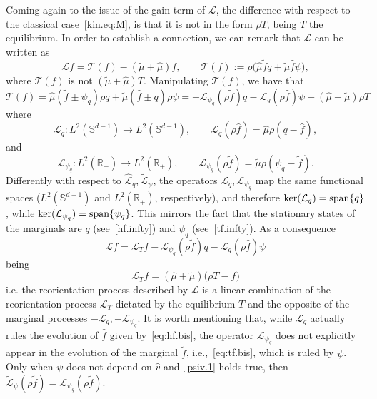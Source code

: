 \documentclass[a4paper]{article}
\theoremstyle{Theorem}\newtheorem{proposition}{Proposition}[section]
\theoremstyle{Remark}\newtheorem{remark}{Remark}[section]
\theoremstyle{Theorem}\newtheorem{theorem}{Theorem}[section]
\newcommand{\R}{\mathbb{R}}
\newcommand{\hv}{\hat{v}}
\newcommand{\hf}{\hat{f}}
\newcommand{\tf}{\tilde{f}}
\newcommand{\hmu}{\hat{\mu}}
\newcommand{\tmu}{\tilde{\mu}}
\begin{document}
Coming again to the issue of the gain term of $\mathcal{L}$, the difference with respect to the classical case~\eqref{kin.eq:M}, is that it is not in the form $\rho T$, being $T$ the equilibrium. In order to establish a connection, we can remark that $\mathcal{L}$ can be written as
\begin{equation}\label{L.tau}
    \mathcal{L}f = \mathcal{T}(f)-(\tmu+\hmu) f, \qquad \mathcal{T}(f) := \rho\big(\hmu \tf q+\tmu \hf \psi\big),
\end{equation}
where $\mathcal{T}(f)$ is not $(\tmu +\hmu) T$.
Manipulating $\mathcal{T}(f)$, we have that
\begin{equation}\label{Tau}
\mathcal{T}(f) = \hmu (\tf \pm \psi_q)\rho q + \tmu (\hf \pm q) \rho\psi = - \mathcal{L}_{\psi_q}(\rho \tf) q -  \mathcal{L}_q(\rho \hf) \psi + (\hmu+\tmu)\rho T
\end{equation}
where
\begin{equation}\label{def:Lq.marg}
\mathcal{L}_{q}:L^2(\mathbb{S}^{d-1}) \to L^2(\mathbb{S}^{d-1}), \qquad \mathcal{L}_{q}(\rho \hf) = \hmu\rho (q -\hf),
\end{equation}
and
\begin{equation*}
\mathcal{L}_{\psi_q}: L^2(\R_+) \to L^2(\R_+), \qquad \mathcal{L}_{\psi_q}(\rho \tf) = \tmu\rho (\psi_q -\tf).
\end{equation*}
Differently with respect to $\hat{\mathcal{L}}_q, \tilde{\mathcal{L}}_{\psi}$, the operators $\mathcal{L}_{q},\mathcal{L}_{\psi_q}$ map the same functional spaces ($L^2(\mathbb{S}^{d-1})$ and $ L^2(\R_+)$, respectively), and therefore  $\ker(\mathcal{L}_q)={\rm span}\lbrace q \rbrace$, while $\ker(\mathcal{L}_{\psi_q})={\rm span}\lbrace \psi_q \rbrace$. This mirrors the fact that the stationary states of the marginals are $q$ (see~\eqref{hf.infty}) and $\psi_q$ (see~\eqref{tf.infty}).
As a consequence
\begin{equation}\label{def:L.T}
\mathcal{L}f =  \mathcal{L}_Tf - \mathcal{L}_{\psi_q}(\rho \tf) q - \mathcal{L}_q(\rho \hf) \psi  
\end{equation}
being
\[
\mathcal{L}_Tf= (\hmu+\tmu)\big(\rho T -f\big)
\]
i.e. the reorientation process described by $\mathcal{L}$ is a linear combination of the reorientation process $\mathcal{L}_T$ dictated by the equilibrium $T$ and the opposite of the marginal processes $-\mathcal{L}_q,-\mathcal{L}_{\psi_q}$. It is worth mentioning that, while $\mathcal{L}_q$ actually rules the evolution of $\hf$ given by~\eqref{eq:hf.bis}, the operator $\mathcal{L}_{\psi_q}$ does not explicitly appear in the evolution of the marginal $\tf$, i.e.,~\eqref{eq:tf.bis}, which is ruled by $\psi$. Only when $\psi$ does not depend on $\hv$ and~\eqref{psiv.1} holds true, then $\tilde{\mathcal{L}}_{\psi}(\rho \tf)=\mathcal{L}_{\psi_q} (\rho \tf)$. 
\end{document}
